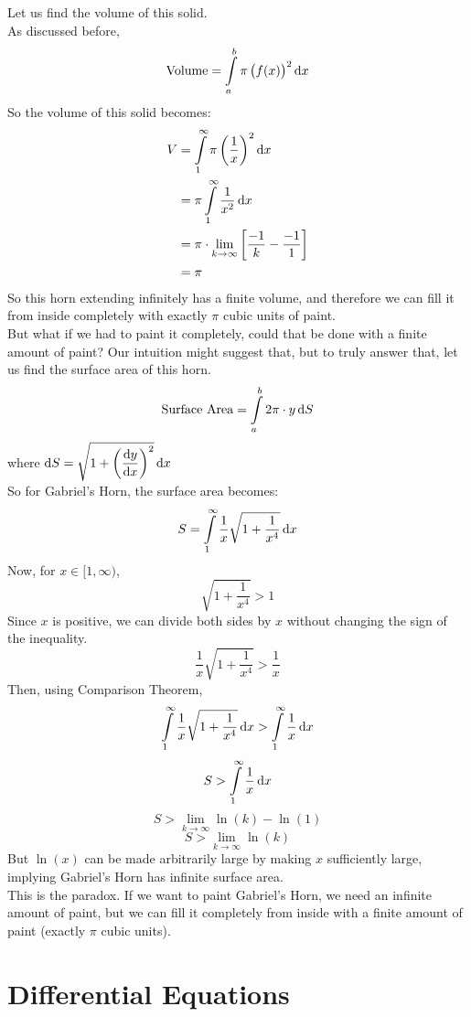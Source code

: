 \documentclass[14]{article}
\theoremstyle{definition}
\theoremstyle{case}
\begin{document}
Let us find the volume of this solid.\\
As discussed before,
\[\text{Volume} = \int\limits_a^b \pi \left(f(x)\right)^2 \dif x\]
So the volume of this solid becomes:
\begin{align*}
V &= \int\limits_1^{\infty} \pi \left(\dfrac1{x}\right)^2 \dif x\\
&= \pi \int\limits_1^{\infty} \dfrac1{x^2} \dif x\\
&= \pi \cdot \lim\limits_{k \to \infty} \left[ \dfrac{-1}{k} - \dfrac{-1}{1} \right]\\
&= \pi
\end{align*}
So this horn extending infinitely has a finite volume, and therefore we can fill it from inside completely with exactly $\pi$ cubic units of paint.\\
But what if we had to paint it completely, could that be done with a finite amount of paint? Our intuition might suggest that, but to truly answer that, let us find the surface area of this horn.\pagebreak
\[\text{Surface Area} = \int\limits_a^b 2\pi \cdot y \dif S\]
where $\dif S = \sqrt{1 + \left( \dfrac{\dif y}{\dif x} \right)^2} \dif x$\\
So for Gabriel's Horn, the surface area becomes:
\[S = \int\limits_1^{\infty} \dfrac1{x} \sqrt{1 + \dfrac1{x^4}} \dif x\]
Now, for $x \in [1, \infty)$, 
\[\sqrt{1 + \dfrac1{x^4}} > 1\]
Since $x$ is positive, we can divide both sides by $x$ without changing the sign of the inequality.
\[\dfrac1{x} \sqrt{1 + \dfrac{1}{x^4}} > \dfrac1x\]
Then, using Comparison Theorem,
\[\int\limits_1^{\infty} \dfrac1{x} \sqrt{1 + \dfrac1{x^4}} \dif x > \int\limits_1^{\infty} \dfrac1{x} \dif x\]
\[S > \int\limits_1^\infty \dfrac1x \dif x\]
\[S > \lim\limits_{k \to \infty} \ln(k) - \ln(1)\]
\[S > \lim\limits_{k \to \infty} \ln(k)\]
But $\ln(x)$ can be made arbitrarily large by making $x$ sufficiently large, implying Gabriel's Horn has infinite surface area.\\
This is the paradox. If we want to paint Gabriel's Horn, we need an infinite amount of paint, but we can fill it completely from inside with a finite amount of paint (exactly $\pi$ cubic units).
\pagebreak
\section{Differential Equations}
\end{document}
